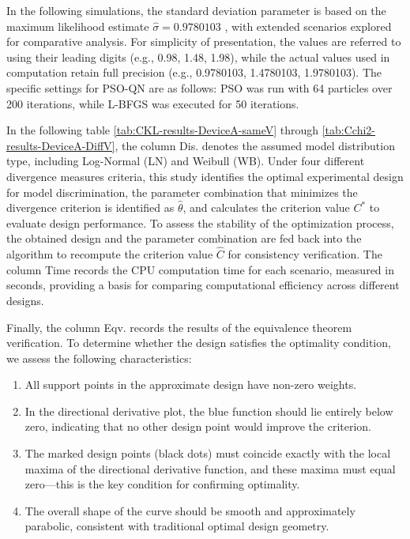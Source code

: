 \hspace*{8mm} In the following simulations, the standard deviation parameter is based on the maximum likelihood estimate $\hat{\sigma} = 0.9780103$ , with extended scenarios explored for comparative analysis. For simplicity of presentation, the values are referred to using their leading digits (e.g., 0.98, 1.48, 1.98), while the actual values used in computation retain full precision (e.g., 0.9780103, 1.4780103, 1.9780103). The specific settings for PSO-QN are as follows: PSO was run with 64 particles over 200 iterations, while L-BFGS was executed for 50 iterations.

\hspace*{8mm} In the following table \ref{tab:CKL-results-DeviceA-sameV} through \ref{tab:Cchi2-results-DeviceA-DiffV}, the column Dis. denotes the assumed model distribution type, including Log-Normal (LN) and Weibull (WB). Under four different divergence measures criteria, this study identifies the optimal experimental design for model discrimination, the parameter combination that minimizes the divergence criterion is identified as $\hat{\theta}$, and calculates the criterion value $C^*$ to evaluate design performance. To assess the stability of the optimization process, the obtained design and the parameter combination are fed back into the algorithm to recompute the criterion value $\hat{C}$ for consistency verification. The column Time records the CPU computation time for each scenario, measured in seconds, providing a basis for comparing computational efficiency across different designs.

\hspace*{8mm} Finally, the column Eqv. records the results of the equivalence theorem verification. To determine whether the design satisfies the optimality condition, we assess the following characteristics:

\begin{enumerate} 
\item All support points in the approximate design have non-zero weights.
\item In the directional derivative plot, the blue function should lie entirely below zero, indicating that no other design point would improve the criterion.
\item The marked design points (black dots) must coincide exactly with the local maxima of the directional derivative function, and these maxima must equal zero—this is the key condition for confirming optimality.
\item The overall shape of the curve should be smooth and approximately parabolic, consistent with traditional optimal design geometry.
\end{enumerate}

